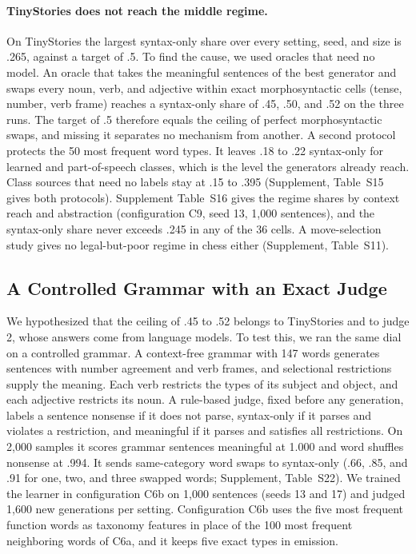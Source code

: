 \documentclass[11pt,letterpaper]{article}
\begin{document}
\paragraph{TinyStories does not reach the middle regime.} On TinyStories the largest syntax-only share over every setting, seed, and size is .265, against a target of .5. To find the cause, we used oracles that need no model.
An oracle that takes the meaningful sentences of the best generator and swaps every noun, verb, and adjective within exact morphosyntactic cells (tense, number, verb frame) reaches a syntax-only share of .45, .50, and .52 on the three runs.
The target of .5 therefore equals the ceiling of perfect morphosyntactic swaps, and missing it separates no mechanism from another.
A second protocol protects the 50 most frequent word types. It leaves .18 to .22 syntax-only for learned and part-of-speech classes, which is the level the generators already reach.
Class sources that need no labels stay at .15 to .395 (Supplement, Table~S15 gives both protocols).
Supplement Table~S16 gives the regime shares by context reach and abstraction (configuration C9, seed 13, 1,000 sentences), and the syntax-only share never exceeds .245 in any of the 36 cells. A move-selection study gives no legal-but-poor regime in chess either (Supplement, Table~S11).

\subsection{A Controlled Grammar with an Exact Judge}
\label{sec:controlled-grammar}

We hypothesized that the ceiling of .45 to .52 belongs to TinyStories and to judge 2, whose answers come from language models. To test this, we ran the same dial on a controlled grammar.
A context-free grammar with 147 words generates sentences with number agreement and verb frames, and selectional restrictions supply the meaning. Each verb restricts the types of its subject and object, and each adjective restricts its noun.
A rule-based judge, fixed before any generation, labels a sentence nonsense if it does not parse, syntax-only if it parses and violates a restriction, and meaningful if it parses and satisfies all restrictions.
On 2,000 samples it scores grammar sentences meaningful at 1.000 and word shuffles nonsense at .994. It sends same-category word swaps to syntax-only (.66, .85, and .91 for one, two, and three swapped words; Supplement, Table~S22).
We trained the learner in configuration C6b on 1,000 sentences (seeds 13 and 17) and judged 1,600 new generations per setting. Configuration C6b uses the five most frequent function words as taxonomy features in place of the 100 most frequent neighboring words of C6a, and it keeps five exact types in emission.
\end{document}

